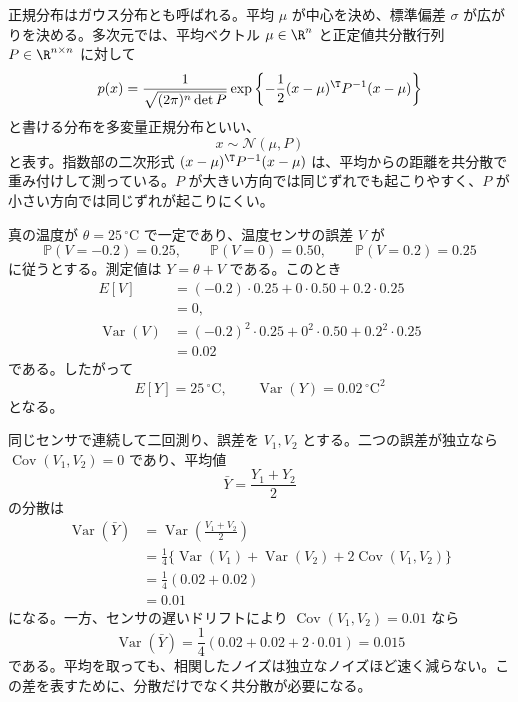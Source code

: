 正規分布はガウス分布とも呼ばれる。平均 $\mu$ が中心を決め、標準偏差 $\sigma$ が広がりを決める。多次元では、平均ベクトル $\mu\in\R^n$ と正定値共分散行列 $P\in\R^{n\times n}$ に対して
\begin{equation}
  p(x)=
  \frac{1}{\sqrt{(2\pi)^n\det P}}
  \exp\left\{
    -\frac{1}{2}(x-\mu)^\T P^{-1}(x-\mu)
  \right\}
\end{equation}
と書ける分布を多変量正規分布といい、
\begin{equation}
  x\sim\mathcal{N}(\mu,P)
\end{equation}
と表す。指数部の二次形式 $(x-\mu)^\T P^{-1}(x-\mu)$ は、平均からの距離を共分散で重み付けして測っている。$P$ が大きい方向では同じずれでも起こりやすく、$P$ が小さい方向では同じずれが起こりにくい。

\begin{example}[センサ平均と相関ノイズ]
真の温度が $\theta=25\,^\circ\mathrm{C}$ で一定であり、温度センサの誤差 $V$ が
\begin{equation}
  \mathbb{P}(V=-0.2)=0.25,\qquad
  \mathbb{P}(V=0)=0.50,\qquad
  \mathbb{P}(V=0.2)=0.25
\end{equation}
に従うとする。測定値は $Y=\theta+V$ である。このとき
\begin{align}
  E[V]
  &=(-0.2)\cdot0.25+0\cdot0.50+0.2\cdot0.25\\
  &=0,\\
  \operatorname{Var}(V)
  &=(-0.2)^2\cdot0.25+0^2\cdot0.50+0.2^2\cdot0.25\\
  &=0.02
\end{align}
である。したがって
\begin{equation}
  E[Y]=25\,^\circ\mathrm{C},
  \qquad
  \operatorname{Var}(Y)=0.02\,^\circ\mathrm{C}^2
\end{equation}
となる。

同じセンサで連続して二回測り、誤差を $V_1,V_2$ とする。二つの誤差が独立なら $\operatorname{Cov}(V_1,V_2)=0$ であり、平均値
\begin{equation}
  \bar{Y}=\frac{Y_1+Y_2}{2}
\end{equation}
の分散は
\begin{align}
  \operatorname{Var}(\bar{Y})
  &=\operatorname{Var}\left(\frac{V_1+V_2}{2}\right)\\
  &=\frac{1}{4}\{\operatorname{Var}(V_1)+\operatorname{Var}(V_2)
    +2\operatorname{Cov}(V_1,V_2)\}\\
  &=\frac{1}{4}(0.02+0.02)\\
  &=0.01
\end{align}
になる。一方、センサの遅いドリフトにより $\operatorname{Cov}(V_1,V_2)=0.01$ なら
\begin{equation}
  \operatorname{Var}(\bar{Y})
  =\frac{1}{4}(0.02+0.02+2\cdot0.01)
  =0.015
\end{equation}
である。平均を取っても、相関したノイズは独立なノイズほど速く減らない。この差を表すために、分散だけでなく共分散が必要になる。
\end{example}

